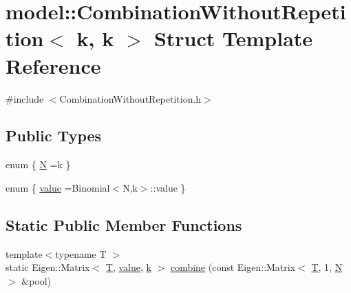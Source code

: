 \hypertarget{structmodel_1_1_combination_without_repetition_3_01k_00_01k_01_4}{}\section{model\+:\+:Combination\+Without\+Repetition$<$ k, k $>$ Struct Template Reference}
\label{structmodel_1_1_combination_without_repetition_3_01k_00_01k_01_4}


{\ttfamily \#include $<$Combination\+Without\+Repetition.\+h$>$}

\subsection*{Public Types}
\begin{DoxyCompactItemize}
\item 
enum \{ \hyperlink{structmodel_1_1_combination_without_repetition_3_01k_00_01k_01_4_a73e327cd8a465ccb14581e370785e0f8a5fed5b863dfa40e08486cabecd320ade}{N} =k
 \}
\item 
enum \{ \hyperlink{structmodel_1_1_combination_without_repetition_3_01k_00_01k_01_4_a1508ae46219559818255fddde0895edea353582ac072a4993679e79d382351479}{value} =Binomial$<$N,k$>$\+:\+:value
 \}
\end{DoxyCompactItemize}
\subsection*{Static Public Member Functions}
\begin{DoxyCompactItemize}
\item 
{\footnotesize template$<$typename T $>$ }\\static Eigen\+::\+Matrix$<$ \hyperlink{_spline_node_base__corder1_8h_a82692d3a5502b91460591f1d5504314a}{T}, \hyperlink{structmodel_1_1_combination_without_repetition_3_01k_00_01k_01_4_a1508ae46219559818255fddde0895edea353582ac072a4993679e79d382351479}{value}, \hyperlink{_f_e_m_2linear__elasticity__3d_2tetgen_2generate_p_o_l_ycube_8m_a5d2aad4440da75aa43f2643e72b1a3bd}{k} $>$ \hyperlink{structmodel_1_1_combination_without_repetition_3_01k_00_01k_01_4_a65a4adf2a00bfcdb1115ba35f24ebe0a}{combine} (const Eigen\+::\+Matrix$<$ \hyperlink{_spline_node_base__corder1_8h_a82692d3a5502b91460591f1d5504314a}{T}, 1, \hyperlink{structmodel_1_1_combination_without_repetition_3_01k_00_01k_01_4_a73e327cd8a465ccb14581e370785e0f8a5fed5b863dfa40e08486cabecd320ade}{N} $>$ \&pool)
\end{DoxyCompactItemize}


